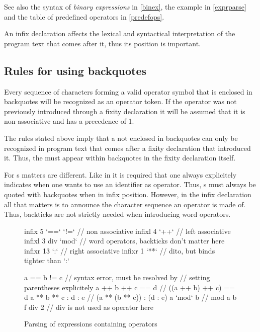 See also the syntax of \emph{binary expressions} in \autoref{binex}, the example in \autoref{exprparse} and the table of predefined operators in \autoref{predefops}.

An infix declaration affects the lexical and syntactical interpretation of the program text that comes after it, thus its position is important.

\subsection{Rules for using backquotes}

Every sequence of characters forming a valid operator symbol that is enclosed in backquotes will be recognized as an operator token. If the operator was not previously introduced through a fixity declaration it will be assumed that it is non-associative and has a precedence of 1.

The rules stated above imply that a  not enclosed in backquotes can only be recognized in program text that comes after a fixity declaration that introduced it. Thus, the  must appear within backquotes in the fixity declaration itself.

For s matters are different. Like in \haskell{} it is required that one always explicitely indicates when one wants to use an identifier as operator. Thus, s must always be quoted with backquotes when in infix position. However, in the infix declaration all that matters is to announce the character sequence an operator is made of. Thus, backticks are not strictly needed when introducing word operators.

\begin{figure}
\begin{code}
infix 5 `==` `!=`      // non associative
infixl 4 `++`          // left associative
infixl 3 div `mod`     // word operators, backticks don't matter here
infixr 13 `:`          // right associative
infixr 1 `**`          // dito, but binds tighter than `:`


a == b != c                 // syntax error, must be resolved by
                            // setting parentheses explicitely
a ++ b ++ c  == d           // ((a ++ b) ++ c) == d
a ** b ** c : d : e         // (a ** (b ** c)) : (d : e)
a `mod` b                   // mod a b
f div 2                     // div is not used as operator here
\end{code}
\caption{Parsing of expressions containing operators} \label{exprparse}
\end{figure}

